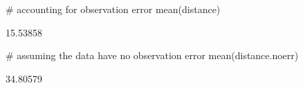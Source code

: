 \begin{Schunk}
\begin{Sinput}
 # accounting for observation error
 mean(distance)
\end{Sinput}
\begin{Soutput}
[1] 15.53858
\end{Soutput}
\begin{Sinput}
 # assuming the data have no observation error
 mean(distance.noerr)
\end{Sinput}
\begin{Soutput}
[1] 34.80579
\end{Soutput}
\end{Schunk}
